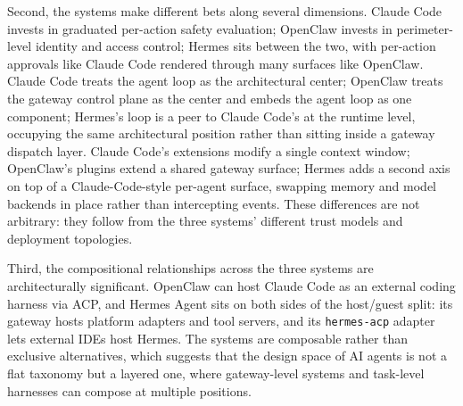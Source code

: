 Second, the systems make different bets along several dimensions. Claude Code invests in graduated per-action safety evaluation; OpenClaw invests in perimeter-level identity and access control; Hermes sits between the two, with per-action approvals like Claude Code rendered through many surfaces like OpenClaw. Claude Code treats the agent loop as the architectural center; OpenClaw treats the gateway control plane as the center and embeds the agent loop as one component; Hermes's loop is a peer to Claude Code's at the runtime level, occupying the same architectural position rather than sitting inside a gateway dispatch layer. Claude Code's extensions modify a single context window; OpenClaw's plugins extend a shared gateway surface; Hermes adds a second axis on top of a Claude-Code-style per-agent surface, swapping memory and model backends in place rather than intercepting events. These differences are not arbitrary: they follow from the three systems' different trust models and deployment topologies.

Third, the compositional relationships across the three systems are architecturally significant. OpenClaw can host Claude Code as an external coding harness via ACP, and Hermes Agent sits on both sides of the host/guest split: its gateway hosts platform adapters and tool servers, and its \texttt{hermes-acp} adapter lets external IDEs host Hermes. The systems are composable rather than exclusive alternatives, which suggests that the design space of AI agents is not a flat taxonomy but a layered one, where gateway-level systems and task-level harnesses can compose at multiple positions.
